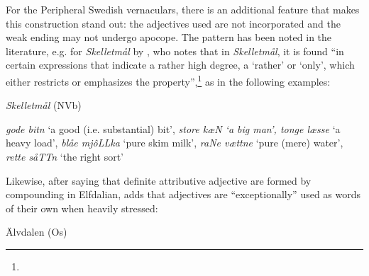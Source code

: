 \begin{styleBodyTextFirst}
For the Peripheral Swedish vernaculars, there is an additional feature that makes this construction stand out: the adjectives used are not incorporated and the weak ending may not undergo apocope. The pattern has been noted in the literature, e.g. for \textit{Skelletmål} by \citet[34]{Marklund1976}, who notes that in \textit{Skelletmål}, it is found “in certain expressions that indicate a rather high degree, a ‘rather’ or ‘only’, which either restricts or emphasizes the property”,\footnote{} as in the following examples:

\end{styleBodyTextFirst}

\begin{listWWNumileveli}
\item 

\begin{styleExample}
\textit{Skelletmål} (NVb)

\end{styleExample}

\end{listWWNumileveli}

\begin{styleListii}
\textit{gode bitn} ‘a good (i.e. substantial) bit’, \textit{store k}\textit{æ}\textit{N ‘a big man’, tonge læsse} ‘a heavy load’, \textit{blåe mjôLLka} ‘pure skim milk’, \textit{raNe vættne} ‘pure (mere) water’, \textit{rette såTTn }‘the right sort’

\end{styleListii}

\begin{styleBodyTextFirst}
Likewise, after saying that definite attributive adjective are formed by compounding in Elfdalian, \citet[53]{Levander1909} adds that adjectives are “exceptionally” used as words of their own when heavily stressed:

\end{styleBodyTextFirst}

\begin{listWWNumileveli}
\item 

\begin{styleExample}
\label{bkm:Ref155246246}Älvdalen (Os)

\end{styleExample}

\end{listWWNumileveli}


